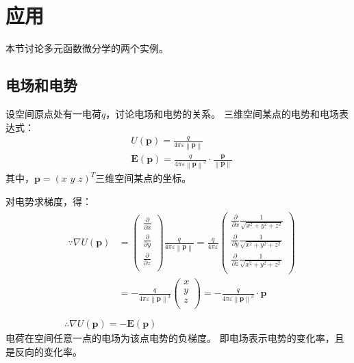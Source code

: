 \section{应用}

本节讨论多元函数微分学的两个实例。

\subsection{电场和电势}

设空间原点处有一电荷$q$，讨论电场和电势的关系。
三维空间某点的电势和电场表达式：
\begin{align*}
&U\left( \boldsymbol{p} \right) =\frac{q}{4\pi \varepsilon \left\| \boldsymbol{p} \right\|} \\
&\boldsymbol{E}\left( \boldsymbol{p} \right) =\frac{q}{4\pi \varepsilon \left\| \boldsymbol{p} \right\| ^2}\cdot \frac{\boldsymbol{p}}{\left\| \boldsymbol{p} \right\|}
\end{align*}
其中，$\boldsymbol{p}=\left( x\,\,y\,\,z \right) ^T$三维空间某点的坐标。

对电势求梯度，得：
\begin{align*}
&\begin{aligned}
	\because \nabla U\left( \boldsymbol{p} \right) &=\left( \begin{array}{c}
	\frac{\partial}{\partial x}\\
	\frac{\partial}{\partial y}\\
	\frac{\partial}{\partial z}\\
\end{array} \right) \frac{q}{4\pi \varepsilon \left\| \boldsymbol{p} \right\|}=\frac{q}{4\pi \varepsilon}\left( \begin{array}{c}
	\frac{\partial}{\partial x}\frac{1}{\sqrt{x^2+y^2+z^2}}\\
	\frac{\partial}{\partial y}\frac{1}{\sqrt{x^2+y^2+z^2}}\\
	\frac{\partial}{\partial z}\frac{1}{\sqrt{x^2+y^2+z^2}}\\
\end{array} \right)\\
	&=-\frac{q}{4\pi \varepsilon \left\| \boldsymbol{p} \right\| ^3}\left( \begin{array}{c}
	x\\
	y\\
	z\\
\end{array} \right) =-\frac{q}{4\pi \varepsilon \left\| \boldsymbol{p} \right\| ^3}\cdot \boldsymbol{p}\\
\end{aligned} \\
&\therefore \nabla U\left( \boldsymbol{p} \right) =-\boldsymbol{E}\left( \boldsymbol{p} \right)
\end{align*}
电荷在空间任意一点的电场为该点电势的负梯度。
即电场表示电势的变化率，且是反向的变化率。

